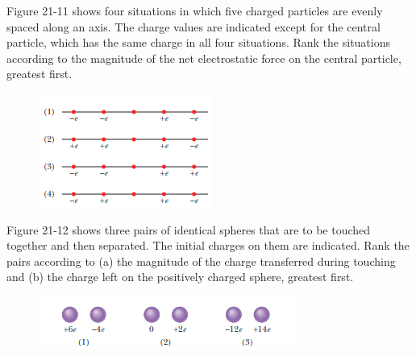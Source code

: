 \documentclass[11pt]{exam}
\begin{document}
\newpage 


\begin{questions}




\addpoints
\question[10] Figure 21-11 shows four situations in which five charged particles are evenly spaced along an axis. The charge values are indicated except for the central particle, which has the same charge in all four situations. Rank the situations according to the magnitude of the net electrostatic force on the central particle, greatest first.\begin{figure}[H]
\centering
\includegraphics[scale=0.8]{assets/Halliday_ch21q1.png}
\end{figure}
\newpage

\addpoints
\question[10] Figure 21-12 shows three pairs of identical spheres that are to be touched together and then separated. The initial charges on them are indicated. Rank the pairs according to (a) the magnitude of the charge transferred during touching and (b)  the charge left on the positively charged sphere, greatest first.\begin{figure}[H]
\centering
\includegraphics[scale=0.8]{assets/Halliday_ch21q2.png}
\end{figure}
\newpage


\end{questions}
\end{document}
